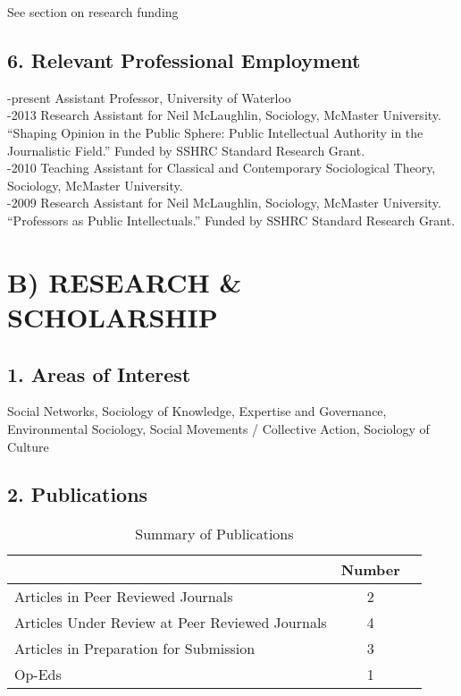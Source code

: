 \documentclass[9pt,usenames,dvipsnames]{article}
\begin{document}
See section on research funding

\subsection*{6. Relevant Professional Employment}

-present Assistant Professor, University of Waterloo \\   

-2013 Research Assistant for Neil McLaughlin, Sociology, McMaster University. ``Shaping Opinion in the Public Sphere: Public Intellectual Authority in the Journalistic Field.'' Funded by SSHRC Standard Research Grant. \\

-2010 Teaching Assistant for Classical and Contemporary Sociological Theory, Sociology, McMaster University. \\

-2009 Research Assistant for Neil McLaughlin, Sociology, McMaster University. ``Professors as Public Intellectuals.'' Funded by SSHRC Standard Research Grant.

\section*{B) RESEARCH \& SCHOLARSHIP}

\subsection*{1. Areas of Interest}

Social Networks, Sociology of Knowledge, Expertise and Governance, Environmental Sociology, Social Movements / Collective Action, Sociology of Culture

\subsection*{2. Publications}

\begin{table}[h!]
\caption{Summary of Publications}\centering
\begin{tabular}{lcc} 
\hline                          
 & Number \\ 
\hline 
Articles in Peer Reviewed Journals & 2 \\
Articles Under Review at Peer Reviewed Journals & 4 \\
Articles in Preparation for Submission & 3 \\
Op-Eds & 1 \\
\hline
\end{tabular}
\end{table}
\end{document}
